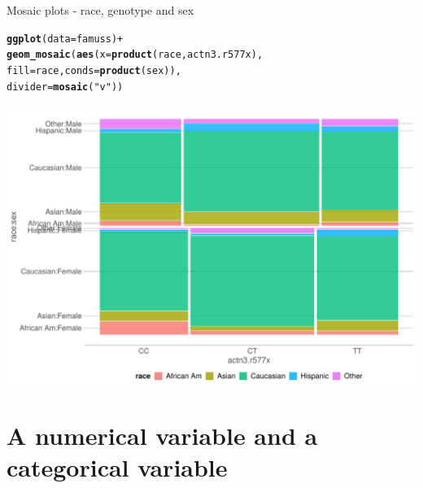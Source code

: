 \documentclass[10pt]{beamer}\usepackage[]{graphicx}\usepackage[]{color}
\makeatletter
\def\maxwidth{ %
  \ifdim\Gin@nat@width>\linewidth
    \linewidth
  \else
    \Gin@nat@width
  \fi
}
\newcommand{\hlstr}[1]{\textcolor[rgb]{0.192,0.494,0.8}{#1}}%
\newcommand{\hlopt}[1]{\textcolor[rgb]{0,0,0}{#1}}%
\newcommand{\hlstd}[1]{\textcolor[rgb]{0.345,0.345,0.345}{#1}}%
\newcommand{\hlkwc}[1]{\textcolor[rgb]{0.333,0.667,0.333}{#1}}%
\newcommand{\hlkwd}[1]{\textcolor[rgb]{0.737,0.353,0.396}{\textbf{#1}}}%
\newenvironment{kframe}{%
 \def\at@end@of@kframe{}%
 \ifinner\ifhmode%
  \def\at@end@of@kframe{\end{minipage}}%
  \begin{minipage}{\columnwidth}%
 \fi\fi%
 \def\FrameCommand##1{\hskip\@totalleftmargin \hskip-\fboxsep
 \colorbox{shadecolor}{##1}\hskip-\fboxsep
     \hskip-\linewidth \hskip-\@totalleftmargin \hskip\columnwidth}%
 \MakeFramed {\advance\hsize-\width
   \@totalleftmargin\z@ \linewidth\hsize
   \@setminipage}}%
 {\par\unskip\endMakeFramed%
 \at@end@of@kframe}
\newenvironment{knitrout}{}{} %
\makeatother
\begin{document}
\begin{frame}[fragile]{Mosaic plots - race, genotype and sex}
\begin{knitrout}\tiny
{}\color{fgcolor}\begin{kframe}
\begin{alltt}
    \hlkwd{ggplot}\hlstd{(}\hlkwc{data} \hlstd{= famuss)} \hlopt{+}
      \hlkwd{geom_mosaic}\hlstd{(}\hlkwd{aes}\hlstd{(}\hlkwc{x} \hlstd{=} \hlkwd{product}\hlstd{(race, actn3.r577x),}
                      \hlkwc{fill} \hlstd{= race,} \hlkwc{conds} \hlstd{=} \hlkwd{product}\hlstd{(sex)),}
                      \hlkwc{divider} \hlstd{=} \hlkwd{mosaic}\hlstd{(}\hlstr{"v"}\hlstd{))}
\end{alltt}
\end{kframe}

{\centering \includegraphics[width=\maxwidth]{figure/mosaic-2-1} 

}



\end{knitrout}
	
\end{frame}



\section{A numerical variable and a categorical variable}
\end{document}
